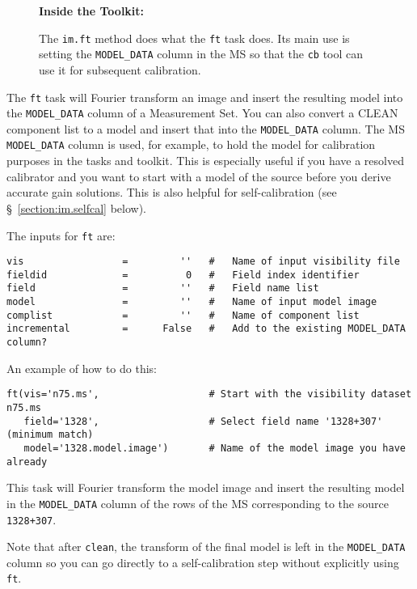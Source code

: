 \begin{wrapfigure}{r}{2.5in}
  \begin{boxedminipage}{2.5in}
     \centerline{\bf Inside the Toolkit:}
     The {\tt im.ft} method does what the {\tt ft} task does.
     Its main use is setting the {\tt MODEL\_DATA} column in the
     MS so that the {\tt cb} tool can use it for subsequent
     calibration.
  \end{boxedminipage}
\end{wrapfigure}

The {\tt ft} task will Fourier transform an image and insert the resulting model into the
{\tt MODEL\_DATA} column of a Measurement Set.
You can also convert a CLEAN component list to a model and insert that
into the {\tt MODEL\_DATA} column.  The MS {\tt MODEL\_DATA} column is
used, for example, to hold the model for calibration purposes in 
the tasks and toolkit.  This is especially useful if you have a resolved
calibrator and you want to start with a model of the source before you
derive accurate gain solutions.  This is also helpful for self-calibration
(see \S~\ref{section:im.selfcal} below).

The inputs for {\tt ft} are:
\small
\begin{verbatim}
vis                 =         ''   #   Name of input visibility file
fieldid             =          0   #   Field index identifier
field               =         ''   #   Field name list
model               =         ''   #   Name of input model image
complist            =         ''   #   Name of component list
incremental         =      False   #   Add to the existing MODEL_DATA column?
\end{verbatim}
\normalsize

An example of how to do this: 
\small
\begin{verbatim}
ft(vis='n75.ms',                   # Start with the visibility dataset n75.ms
   field='1328',                   # Select field name '1328+307' (minimum match) 
   model='1328.model.image')       # Name of the model image you have already
\end{verbatim}
\normalsize
This task will Fourier transform the model image and insert the
resulting model in the {\tt MODEL\_DATA} column of the rows of the MS 
corresponding to the source {\tt 1328+307}.

Note that after {\tt clean}, the transform of the final model is
left in the {\tt MODEL\_DATA} column so you can go directly to
a self-calibration step without explicitly using {\tt ft}.

